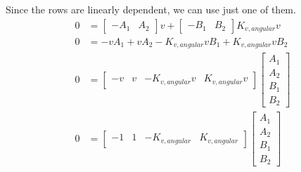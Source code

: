 Since the rows are linearly dependent, we can use just one of them.
\begin{align*}
  0 &=
    \begin{bmatrix}
      -A_1 & A_2
    \end{bmatrix} v +
    \begin{bmatrix}
      -B_1 & B_2
    \end{bmatrix} K_{v,angular} v \\
  0 &= -v A_1 + v A_2 - K_{v,angular} v B_1 + K_{v,angular} v B_2 \\
  0 &=
    \begin{bmatrix}
      -v & v & -K_{v,angular} v & K_{v,angular} v
    \end{bmatrix}
    \begin{bmatrix}
      A_1 \\
      A_2 \\
      B_1 \\
      B_2
    \end{bmatrix} \\
  0 &=
    \begin{bmatrix}
      -1 & 1 & -K_{v,angular} & K_{v,angular}
    \end{bmatrix}
    \begin{bmatrix}
      A_1 \\
      A_2 \\
      B_1 \\
      B_2
    \end{bmatrix}
\end{align*}

